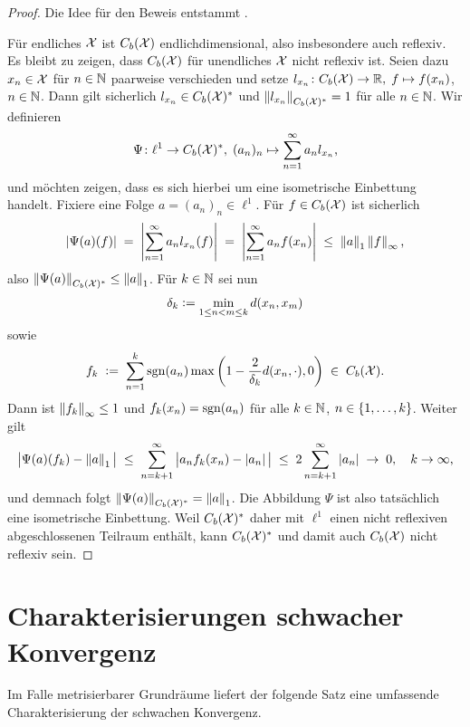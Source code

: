 \documentclass[../thesis/thesis.tex]{subfiles}
\begin{document}
	\begin{proof}
		Die Idee für den Beweis entstammt \cite{Martin.2019}.
		
		Für endliches $\mathcal{X}$ ist $C_b(\mathcal{X})$ endlichdimensional, also insbesondere auch reflexiv. 
		Es bleibt zu zeigen, dass $C_b(\mathcal{X})$ für unendliches $\mathcal{X}$ nicht reflexiv ist. Seien dazu $x_n \in \mathcal{X}$ für $n \in \mathbb{N}$ paarweise verschieden und setze
		$l_{x_n} \colon C_b(\mathcal{X}) \to \mathbb{R}, \; f \mapsto f(x_n) $, $n \in \mathbb{N}$. Dann gilt sicherlich $l_{x_n} \in C_b(\mathcal{X})^\ast$ und $\left\lVert l_{x_n}\right\rVert_{C_b(\mathcal{X})^\ast} = 1$ für alle $n \in \mathbb{N}$.
		Wir definieren
		\[ \Psi \colon \ell^1 \to C_b(\mathcal{X})^\ast, \; (a_n)_n \mapsto \sum_{n=1}^{\infty} a_n l_{x_n}  \text{,} \]
		und möchten zeigen, dass es sich hierbei um eine isometrische Einbettung handelt. Fixiere eine Folge $a = (a_n)_n \in \ell^1$. Für $f \in C_b(\mathcal{X})$ ist sicherlich
		\[ \left| \Psi(a)(f) \right| \; = \; \left| \sum_{n=1}^{\infty} a_n l_{x_n}(f) \right| \; = \; \left| \sum_{n=1}^{\infty} a_n f(x_n) \right| \; \leq \; \left\lVert a\right\rVert_1 \left\lVert f\right\rVert_{\infty} \text{,} \]
		also $\left\lVert\Psi(a)\right\rVert_{C_b(\mathcal{X})^\ast} \leq \left\lVert a\right\rVert_1$. Für $k \in \mathbb{N}$ sei nun 
		\[\delta_k \vcentcolon = \min_{1 \leq n < m \leq k} d(x_n, x_m)\] 
		sowie
		\[ f_k \; \vcentcolon = \; \sum_{n=1}^{k} \mathrm{sgn}(a_n) \max \left( 1 - \frac{2}{\delta_k} d(x_n, \cdot), 0 \right) \; \in \; C_b(\mathcal{X}) \text{.} \]
		Dann ist $\left\lVert f_k\right\rVert_{\infty} \leq 1$ und $f_k(x_n) = \mathrm{sgn}(a_n)$ für alle $k \in \mathbb{N}$, $n \in \left\{1,\dots,k\right\}$. Weiter gilt
		\[ \big| \Psi(a)(f_k) - \left\lVert a\right\rVert_1 \big| \; \leq \; \sum_{n=k+1}^{\infty} \big| a_n f_k(x_n) - \left| a_n \right| \big| 
		\; \leq \; 2 \sum_{n=k+1}^{\infty} \left| a_n \right| \; \to \; 0, \quad k \to \infty \text{,} \]
		und demnach folgt $\left\lVert\Psi(a)\right\rVert_{C_b(\mathcal{X})^\ast} = \left\lVert a\right\rVert_1$. Die Abbildung $\Psi$ ist also tatsächlich eine isometrische Einbettung. Weil $C_b(\mathcal{X})^\ast$ daher mit $\ell^1$ einen nicht reflexiven
		abgeschlossenen Teilraum enthält, kann $C_b(\mathcal{X})^\ast$ und damit auch $C_b(\mathcal{X})$ nicht reflexiv sein.
	\end{proof}
	
	\section{Charakterisierungen schwacher Konvergenz}
	\label{subsec:charakterisierung_schwache_konvergenz}
	
	Im Falle metrisierbarer Grundräume liefert der folgende Satz eine umfassende Charakterisierung der schwachen Konvergenz.
	
\end{document}
